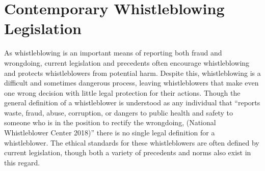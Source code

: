\documentclass [12 pt] {article}
\begin{document}
\section{Contemporary Whistleblowing Legislation}
As whistleblowing is an important means of reporting both fraud and wrongdoing, current legislation and precedents often encourage whistleblowing and protects whistleblowers from potential harm. Despite this, whistleblowing is a difficult and sometimes dangerous process, leaving whistleblowers that make even one wrong decision with little legal protection for their actions. Though the general definition of a whistleblower is understood as any individual that ``reports waste, fraud, abuse, corruption, or dangers to public health and safety to someone who is in the position to rectify the wrongdoing, (National Whistleblower Center 2018)'' there is no single legal definition for a whistleblower. The ethical standards for these whistleblowers are often defined by current legislation, though both a variety of precedents and norms also exist in this regard.
\bigbreak
\end{document}
